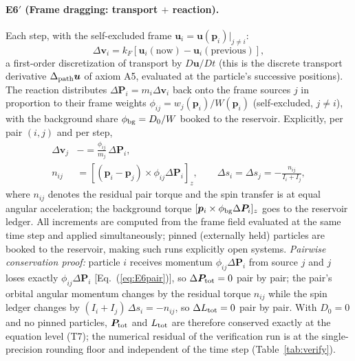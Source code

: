\documentclass[aps,reprint,amsmath,amssymb,nofootinbib,superscriptaddress,floatfix]{revtex4-2}
\newcommand{\vect}[1]{\bm{#1}}
\newcommand{\Dz}{D_0}
\begin{document}
\paragraph*{E6$'$ (Frame dragging: transport $+$ reaction).}
Each step, with the self-excluded frame
$\vect{u}_i = \vect{u}(\vect{p}_i)|_{j \ne i}$:
\begin{equation}
\Delta\vect{v}_i = k_F\left[\vect{u}_i(\text{now})
 - \vect{u}_i(\text{previous})\right],
\label{eq:E6}
\end{equation}
a first-order discretization of transport by $D\vect{u}/Dt$
(this is the discrete transport derivative $\Delta_{\rm path}\vect{u}$
of axiom A5, evaluated at the particle's successive positions).
The reaction distributes $\Delta\vect{P}_i = m_i\Delta\vect{v}_i$ back
onto the frame sources $j$ in proportion to their frame weights
$\phi_{ij} = w_j(\vect{p}_i)/W(\vect{p}_i)$ (self-excluded,
$j \ne i$), with the background share $\phi_{\rm bg} = \Dz/W$ booked to
the reservoir.
Explicitly, per pair $(i,j)$ and per step,
\begin{align}
\Delta\vect{v}_j &\mathrel{-}= \frac{\phi_{ij}}{m_j}\,
 \Delta\vect{P}_i,\nonumber\\
n_{ij} &= \left[(\vect{p}_i-\vect{p}_j)\times
 \phi_{ij}\Delta\vect{P}_i\right]_z,\qquad
\Delta s_i = \Delta s_j = -\frac{n_{ij}}{I_i+I_j},
\label{eq:E6pair}
\end{align}
where $n_{ij}$ denotes the residual pair torque and the spin transfer
is at
equal angular acceleration; the background torque
$[\vect{p}_i \times \phi_{\rm bg}\Delta\vect{P}_i]_z$ goes to the
reservoir ledger.
All increments are computed from the frame field evaluated at the same
time step and applied
simultaneously; pinned (externally held) particles are booked to the
reservoir, making such runs explicitly open systems.
\emph{Pairwise conservation proof:} particle $i$ receives momentum
$\phi_{ij}\Delta\vect{P}_i$ from source $j$ and $j$ loses exactly
$\phi_{ij}\Delta\vect{P}_i$ [Eq.~(\ref{eq:E6pair})], so
$\Delta\vect{P}_{\rm tot} = 0$ pair by pair; the pair's orbital angular momentum
changes by the residual torque $n_{ij}$ while the spin ledger changes
by $(I_i+I_j)\,\Delta s_i = -n_{ij}$, so $\Delta L_{\rm tot} = 0$ pair
by pair.
With $\Dz = 0$ and no pinned particles, $\vect{P}_{\rm tot}$ and $L_{\rm tot}$
are therefore conserved exactly at the equation level (T7); the
numerical residual of the verification run is at the single-precision
rounding floor and independent of the time step
(Table~\ref{tab:verify}).
\end{document}
